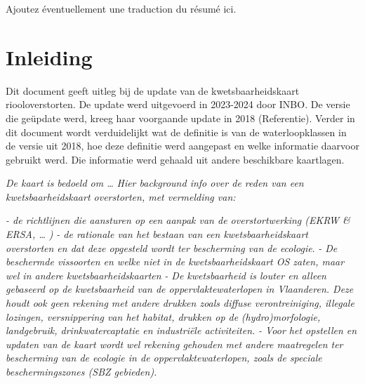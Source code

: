 \documentclass[twoside]{extreport}
\begin{document}
Ajoutez éventuellement une traduction du résumé ici.

\efrench


\clearpage

{}
\setcounter{tocdepth}{1}
\tableofcontents

\clearpage

{}
\listoffigures
\vspace{34pt}

{}
\listoftables

\clearpage


\chapter{Inleiding}\label{inleiding}

Dit document geeft uitleg bij de update van de kwetsbaarheidskaart
riooloverstorten. De update werd uitgevoerd in 2023-2024 door INBO. De
versie die geüpdate werd, kreeg haar voorgaande update in 2018
(Referentie). Verder in dit document wordt verduidelijkt wat de
definitie is van de waterloopklassen in de versie uit 2018, hoe deze
definitie werd aangepast en welke informatie daarvoor gebruikt werd. Die
informatie werd gehaald uit andere beschikbare kaartlagen.

\emph{De kaart is bedoeld om \ldots{}} \emph{Hier background info over
de reden van een kwetsbaarheidskaart overstorten, met vermelding van:}

\emph{- de richtlijnen die aansturen op een aanpak van de
overstortwerking (EKRW \& ERSA, \ldots{} )} \emph{- de rationale van het
bestaan van een kwetsbaarheidskaart overstorten en dat deze opgesteld
wordt ter bescherming van de ecologie}. \emph{- De beschermde vissoorten
en welke niet in de kwetsbaarheidskaart OS zaten, maar wel in andere
kwetsbaarheidskaarten} \emph{- De kwetsbaarheid is louter en alleen
gebaseerd op de kwetsbaarheid van de oppervlaktewaterlopen in
Vlaanderen. Deze houdt ook geen} \emph{rekening met andere drukken zoals
diffuse verontreiniging, illegale lozingen, versnippering van het
habitat, drukken op de} \emph{(hydro)morfologie, landgebruik,
drinkwatercaptatie en industriële activiteiten.} \emph{- Voor het
opstellen en updaten van de kaart wordt wel rekening gehouden met andere
maatregelen ter bescherming van de ecologie in de oppervlaktewaterlopen,
zoals de speciale beschermingszones (SBZ gebieden).}
\end{document}

